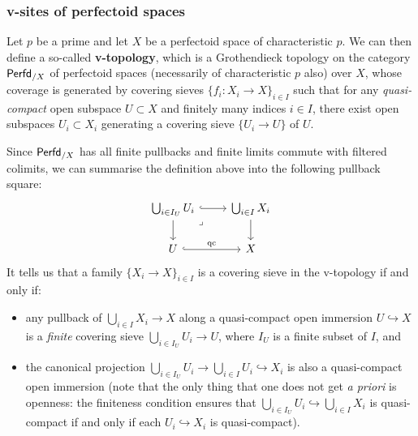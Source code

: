             \subsubsection{v-sites of perfectoid spaces}
                \begin{definition} \label{def: v_topology} 
                    Let $p$ be a prime and let $X$ be a perfectoid space of characteristic $p$. We can then define a so-called \textbf{v-topology}, which is a Grothendieck topology on the category $\mathsf{Perfd}_{/X}$ of perfectoid spaces (necessarily of characteristic $p$ also) over $X$, whose coverage is generated by covering sieves $\{f_i: X_i \to X\}_{i \in I}$ such that for any \textit{quasi-compact} open subspace $U \subset X$ and finitely many indices $i \in I$, there exist open subspaces $U_i \subset X_i$ generating a covering sieve $\{U_i \to U\}$ of $U$. 
                \end{definition}
                \begin{remark}
                    Since $\mathsf{Perfd}_{/X}$ has all finite pullbacks and finite limits commute with filtered colimits, we can summarise the definition above into the following pullback square:
                        $$
                            \begin{tikzcd}
                            	{\bigcup_{i \in I_U} U_i} & {\bigcup_{i \in I} X_i} \\
                            	U & X
                            	\arrow[from=1-2, to=2-2]
                            	\arrow[from=1-1, to=2-1]
                            	\arrow["\qc", hook, from=2-1, to=2-2]
                            	\arrow[hook, from=1-1, to=1-2]
                            	\arrow["\lrcorner"{anchor=center, pos=0.125}, draw=none, from=1-1, to=2-2]
                            \end{tikzcd}
                        $$
                    It tells us that a family $\{X_i \to X\}_{i \in I}$ is a covering sieve in the v-topology if and only if:
                        \begin{itemize}
                            \item any pullback of $\bigcup_{i \in I} X_i \to X$ along a quasi-compact open immersion $U \hookrightarrow X$ is a \textit{finite} covering sieve $\bigcup_{i \in I_U} U_i \to U$, where $I_U$ is a finite subset of $I$, and
                            \item the canonical projection $\bigcup_{i \in I_U} U_i \to \bigcup_{i \in I} U_i \hookrightarrow X_i$ is also a quasi-compact open immersion (note that the only thing that one does not get \textit{a priori} is openness: the finiteness condition ensures that $\bigcup_{i \in I_U} U_i \hookrightarrow \bigcup_{i \in I} X_i$ is quasi-compact if and only if each $U_i \hookrightarrow X_i$ is quasi-compact).
                        \end{itemize}
                \end{remark}
                
